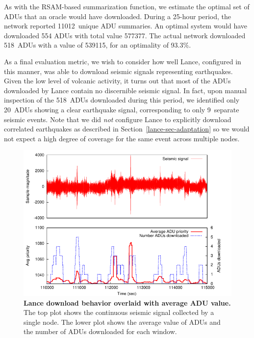 As with the RSAM-based summarization function, we estimate the optimal set of
ADUs that an oracle would have downloaded. During a 25-hour period, the
network reported 11012~unique ADU summaries. An optimal system would have
downloaded 554 ADUs with total value 577377. The actual network downloaded
518~ADUs with a value of 539115, for an optimality of 93.3\%.

As a final evaluation metric, we wish to consider how well Lance, configured
in this manner, was able to download seismic signals representing
earthquakes. Given the low level of volcanic activity, it turns out that most
of the ADUs downloaded by Lance contain no discernible seismic signal. In
fact, upon manual inspection of the 518~ADUs downloaded during this period,
we identified only 20~ADUs showing a clear earthquake signal, corresponding
to only 9~separate seismic events. Note that we did \textit{not} configure
Lance to explicitly download correlated earthquakes as described in
Section~\ref{lance-sec-adaptation} so we would not expect a high degree of
coverage for the same event across multiple nodes.

\begin{figure}[t]
\begin{center}
\includegraphics[width=1.0\hsize]{./4-lance/figs/everything.pdf}
\end{center}

\caption{\textbf{Lance download behavior overlaid with average ADU value.}
The top plot shows the continuous seismic signal collected by a single node.
The lower plot shows the average value of ADUs and the number of ADUs
downloaded for each window.}

\label{lance-fig-everything}
\end{figure}

